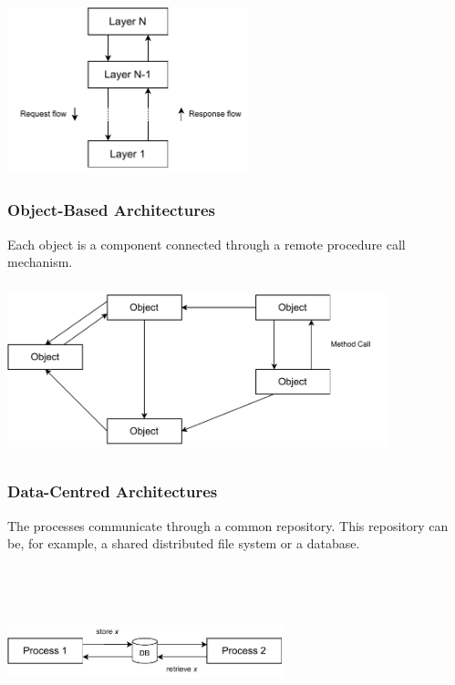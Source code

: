 \documentclass{article}
\begin{document}
\begin{center}
	\includegraphics[width=7cm, height=5cm, keepaspectratio]{assets/layered.pdf}
\end{center}

\subsubsection{Object-Based Architectures}
Each object is a component connected through a remote procedure call mechanism.

\begin{center}
	\includegraphics[width=11cm, height=5cm, keepaspectratio]{assets/object-based.pdf}
\end{center}

\subsubsection{Data-Centred Architectures}
The processes communicate through a common repository. This repository can be, for example, a shared distributed file system or a database.

\begin{center}
	\includegraphics[width=8cm, height=5cm, keepaspectratio]{assets/data-centered.pdf}
\end{center}
\end{document}
